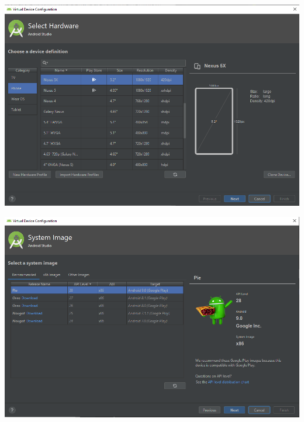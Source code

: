 \documentclass[answers]{exam}
\begin{document}
\begin{questions}
\begin{framed}
    \begin{center}
        \includegraphics[width=15.5cm]{img/AndroidVirtualDevices_01.png}
    \end{center}
    \begin{center}
        \includegraphics[width=15.5cm]{img/AndroidVirtualDevices_02.png}
    \end{center}
    \begin{center}

\end{center}
\end{framed}
\end{questions}
\end{document}
